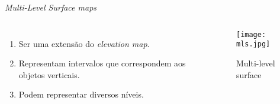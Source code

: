\begin{frame}[t]{\textit{Multi-Level Surface maps}} 
    \transdissolve[duration=0.5]
        \begin{columns}[t]
                \begin{enumerate}
                    \item Ser uma extensão do \textit{elevation map}.
                    \item Representam intervalos que correspondem aos objetos verticais.
                    \item Podem representar diversos níveis.
                \end{enumerate}
            \begin{center}
                \begin{figure}
                    \texttt{[image: mls.jpg]}
                    \caption{Multi-level surface\cite{article}}
                \end{figure}
            \end{center}
        \end{columns}
\end{frame}

   
    

